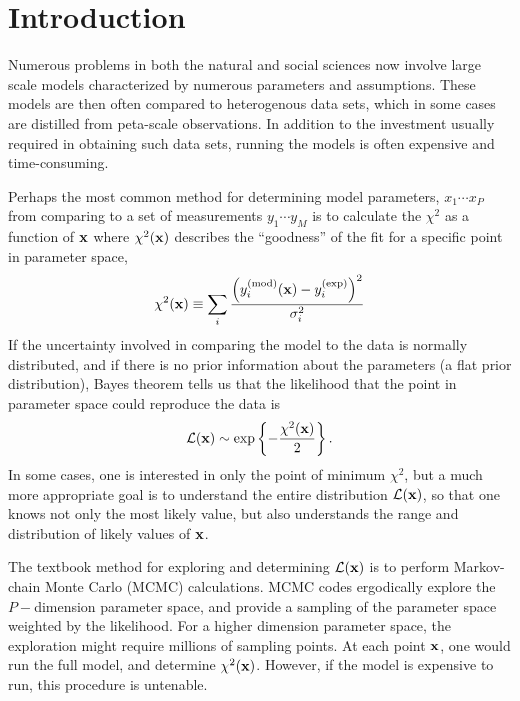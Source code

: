 \section{Introduction}

Numerous problems in both the natural and social sciences now involve large scale models characterized by numerous parameters and assumptions. These models are then often compared to heterogenous data sets, which in some cases are distilled from peta-scale observations. In addition to the investment usually required in obtaining such data sets, running the models is often expensive and time-consuming. 

Perhaps the most common method for determining model parameters, $x_1\cdots x_P$ from comparing to a set of measurements $y_1\cdots y_M$ is to calculate the $\chi^2$ as a function of ${\bf x}$ where $\chi^2({\bf x})$ describes the ``goodness'' of the fit for a specific point in parameter space,
\begin{equation}
\chi^2({\bf x})\equiv
\sum_i \frac{\left(y_i^{\rm(mod)}({\bf x})-y_i^{\rm(exp)}\right)^2}{\sigma_i^2}
\end{equation}
If the uncertainty involved in comparing the model to the data is normally distributed, and if there is no prior information about the parameters (a flat prior distribution), Bayes theorem tells us that the likelihood that the point in parameter space could reproduce the data is
\begin{equation}
\mathcal{L}({\bf x})\sim \exp\left\{-\frac{\chi^2({\bf x})}{2}\right\}.
\end{equation}
In some cases, one is interested in only the point of minimum $\chi^2$, but a much more appropriate goal is to understand the entire distribution $\mathcal{L}({\bf x})$, so that one knows not only the most likely value, but also understands the range and distribution of likely values of ${\bf x}$. 

The textbook method for exploring and determining $\mathcal{L}({\bf x})$ is to perform Markov-chain Monte Carlo (MCMC) calculations. MCMC codes ergodically explore the $P-$dimension parameter space, and provide a sampling of the parameter space weighted by the likelihood. For a higher dimension parameter space, the exploration might require millions of sampling points. At each point ${\bf x}$, one would run the full model, and determine $\chi^2({\bf x})$. However, if the model is expensive to run, this procedure is untenable.

